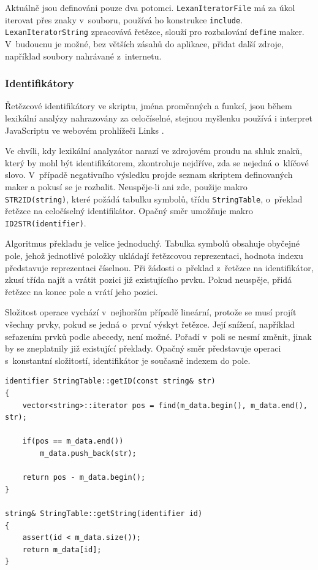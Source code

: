 \documentclass[11pt,twoside,a4paper]{book}
\begin{document}
Aktuálně jsou definováni pouze dva potomci. \texttt{LexanIteratorFile} má za úkol iterovat přes znaky v~souboru, používá ho konstrukce \texttt{include}. \texttt{Le\-xan\-Ite\-ra\-tor\-String} zpracovává ře\-těz\-ce, slouží pro rozbalování \texttt{define} maker. V~budoucnu je možné, bez větších zásahů do aplikace, přidat další zdroje, například soubory nahrávané z~internetu.


\subsubsection{Identifikátory}
\label{identifikatory}

Řetězcové identifikátory ve skriptu, jména proměnných a funkcí, jsou během lexikální analýzy nahrazovány za celočíselné, stejnou myšlenku používá i interpret JavaScriptu ve webovém prohlížeči Links \cite[str. 25]{links}.

Ve chvíli, kdy lexikální analyzátor narazí ve zdrojovém proudu na shluk znaků, který by mohl být identifikátorem, zkontroluje nejdříve, zda se nejedná o~klíčové slovo. V~případě negativního výsledku projde seznam skriptem definovaných maker a pokusí se je rozbalit. Neuspěje-li ani zde, použije makro \texttt{STR2ID(string)}, které požádá tabulku symbolů, třídu \texttt{StringTable}, o~překlad řetězce na celočíselný identifikátor. Opačný směr umožňuje makro \texttt{ID2STR(identifier)}.

Algoritmus překladu je velice jednoduchý. Tabulka symbolů obsahuje obyčejné pole, jehož jednotlivé položky ukládají řetězcovou reprezentaci, hodnota indexu představuje reprezentaci číselnou. Při žádosti o~překlad z~řetězce na identifikátor, zkusí třída najít a vrátit pozici již existujícího prvku. Pokud neuspěje, přidá řetězec na konec pole a vrátí jeho pozici.

Složitost operace vychází v~nejhorším případě lineární, protože se musí projít všechny prvky, pokud se jedná o~první výskyt řetězce. Její snížení, například seřazením prvků podle abecedy, není možné. Pořadí v~poli se nesmí změnit, jinak by se zneplatnily již existující překlady. Opačný směr představuje operaci s~konstantní složitostí, identifikátor je současně indexem do pole.

\begin{verbatim}
identifier StringTable::getID(const string& str)
{
    vector<string>::iterator pos = find(m_data.begin(), m_data.end(), str);

    if(pos == m_data.end())
        m_data.push_back(str);

    return pos - m_data.begin();
}

string& StringTable::getString(identifier id)
{
    assert(id < m_data.size());
    return m_data[id];
}
\end{verbatim}
\end{document}
